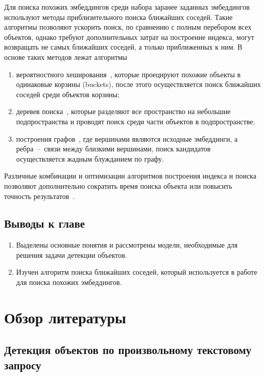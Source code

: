\documentclass[a4paper,14pt]{article}
\begin{document}
    Для поиска похожих эмбеддингов среди набора заранее заданных эмбеддингов используют методы приблизительного поиска ближайших соседей.
    Такие алгоритмы позволяют ускорить поиск, по сравнению с полным перебором всех объектов, однако требуют дополнительных затрат на построение индекса,
    могут возвращать не самых ближайших соседей, а только приближенных к ним.
    В основе таких методов лежат алгоритмы 
    \begin{enumerate}
    	[1)]
    	\itemsep0em
    	\item вероятностного хеширования~\cite{tao2010efficient}, которые проецируют похожие объекты в одинаковые корзины (buckets), после этого осуществляется поиск ближайших соседей среди объектов корзины;
    	\item деревев поиска~\cite{liu2006new}, которые разделяют все пространство на небольшие подпространства и проводят поиск среди части объектов в подпространстве;
    	\item построения графов~\cite{malkov2018efficient}, где вершинами являются исходные эмбеддинги, а
    	ребра~--~связи между близкими вершинами, поиск кандидатов осуществляется жадным блужданием по графу.
    \end{enumerate}
    Различные комбинации и оптимизации алгоритмов построения индекса и поиска позволяют дополнительно сократить время поиска объекта или повысить точность результатов~\cite{annoy,avq_2020}.

    \subsection{Выводы к главе \thesection}
    \begin{enumerate}
        \itemsep0em
        \item Выделены основные понятия и рассмотрены модели, необходимые для решения задачи детекции объектов.
        \item Изучен алгоритм поиска ближайших соседей, который используется в работе для поиска похожих эмбеддингов.
    \end{enumerate}

    \newpage


    \section{Обзор литературы}

    \subsection{Детекция объектов по произвольному текстовому запросу}
\end{document}
